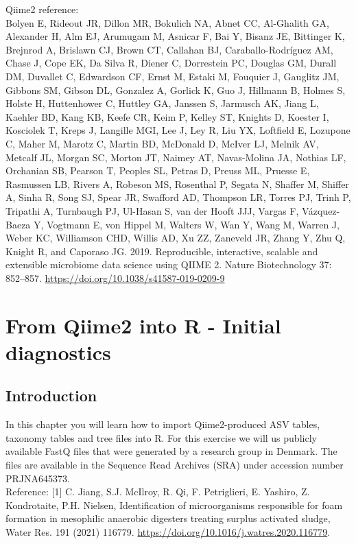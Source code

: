 \documentclass[
]{book}
\begin{document}
Qiime2 reference:\\
Bolyen E, Rideout JR, Dillon MR, Bokulich NA, Abnet CC, Al-Ghalith GA, Alexander H, Alm EJ, Arumugam M, Asnicar F, Bai Y, Bisanz JE, Bittinger K, Brejnrod A, Brislawn CJ, Brown CT, Callahan BJ, Caraballo-Rodríguez AM, Chase J, Cope EK, Da Silva R, Diener C, Dorrestein PC, Douglas GM, Durall DM, Duvallet C, Edwardson CF, Ernst M, Estaki M, Fouquier J, Gauglitz JM, Gibbons SM, Gibson DL, Gonzalez A, Gorlick K, Guo J, Hillmann B, Holmes S, Holste H, Huttenhower C, Huttley GA, Janssen S, Jarmusch AK, Jiang L, Kaehler BD, Kang KB, Keefe CR, Keim P, Kelley ST, Knights D, Koester I, Kosciolek T, Kreps J, Langille MGI, Lee J, Ley R, Liu YX, Loftfield E, Lozupone C, Maher M, Marotz C, Martin BD, McDonald D, McIver LJ, Melnik AV, Metcalf JL, Morgan SC, Morton JT, Naimey AT, Navas-Molina JA, Nothias LF, Orchanian SB, Pearson T, Peoples SL, Petras D, Preuss ML, Pruesse E, Rasmussen LB, Rivers A, Robeson MS, Rosenthal P, Segata N, Shaffer M, Shiffer A, Sinha R, Song SJ, Spear JR, Swafford AD, Thompson LR, Torres PJ, Trinh P, Tripathi A, Turnbaugh PJ, Ul-Hasan S, van der Hooft JJJ, Vargas F, Vázquez-Baeza Y, Vogtmann E, von Hippel M, Walters W, Wan Y, Wang M, Warren J, Weber KC, Williamson CHD, Willis AD, Xu ZZ, Zaneveld JR, Zhang Y, Zhu Q, Knight R, and Caporaso JG. 2019. Reproducible, interactive, scalable and extensible microbiome data science using QIIME 2. Nature Biotechnology 37: 852--857. \url{https://doi.org/10.1038/s41587-019-0209-9}

\hypertarget{Qiime2R}{%
\chapter{From Qiime2 into R - Initial diagnostics}\label{Qiime2R}}

\hypertarget{introduction-2}{%
\section{Introduction}\label{introduction-2}}

In this chapter you will learn how to import Qiime2-produced ASV tables, taxonomy tables and tree files into R. For this exercise we will us publicly available FastQ files that were generated by a research group in Denmark. The files are available in the Sequence Read Archives (SRA) under accession number PRJNA645373.\\
Reference: {[}1{]} C. Jiang, S.J. McIlroy, R. Qi, F. Petriglieri, E. Yashiro, Z. Kondrotaite, P.H. Nielsen, Identification of microorganisms responsible for foam formation in mesophilic anaerobic digesters treating surplus activated sludge, Water Res. 191 (2021) 116779. \url{https://doi.org/10.1016/j.watres.2020.116779}.
\end{document}
